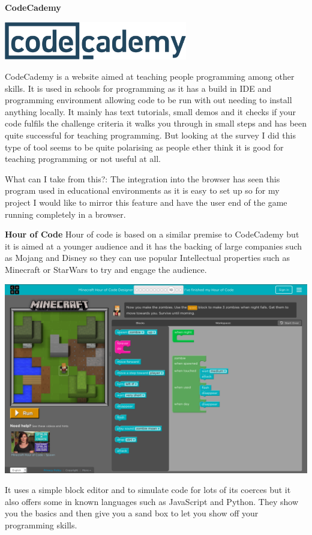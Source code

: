 \documentclass[12pt]{article}
\begin{document}
\textbf{CodeCademy}

{\centering
\includegraphics[width=8cm]{Images/codecademy_logo.png}\par
}
CodeCademy is a website aimed at teaching people programming among other skills. It is used in schools for programming as it has a build in IDE and programming environment allowing code to be run with out needing to install anything locally. It mainly has text tutorials, small demos and it checks if your code fulfils the challenge criteria it walks you through in small steps and has been quite successful for teaching programming. But looking at the survey I did this type of tool seems to be quite polarising as people ether think it is good for teaching programming or not useful at all. 

What can I take from this?:\newline
The integration into the browser has seen this program used in educational environments as it is easy to set up so for my project I would like to mirror this feature and have the user end of the game running completely in a browser.

\textbf{Hour of Code}\newline
Hour of code is based on a similar premise to CodeCademy but it is aimed at a younger audience and it has the backing of large companies such as Mojang and Disney so they can use popular Intellectual properties such as Minecraft or StarWars to try and engage the audience.
{\centering
\includegraphics[width=15cm]{Images/HourOfCode.png}\par
}
It uses a simple block editor and to simulate code for lots of its coerces but it also offers some in known languages such as JavaScript and Python. They show you the basics and then give you a sand box to let you show off your programming skills.
\end{document}

